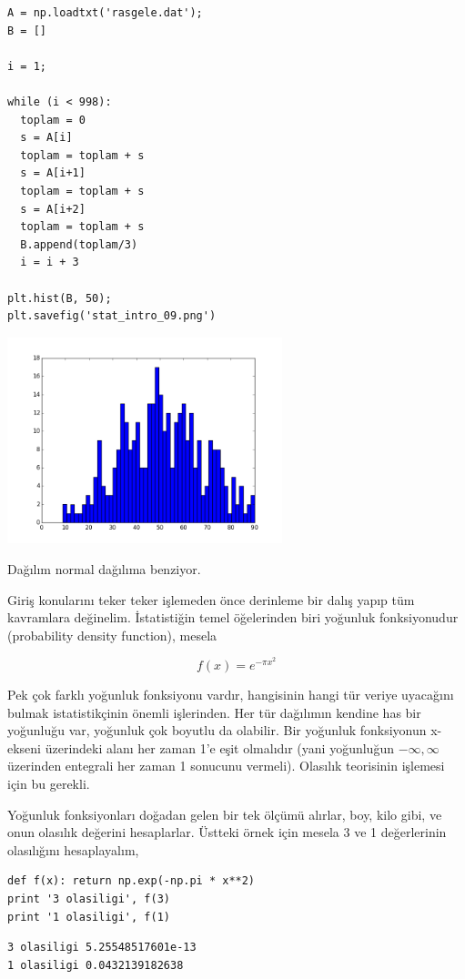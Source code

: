 \documentclass[12pt,fleqn]{article}\usepackage{../../common}
\begin{document}
\begin{verbatim}
A = np.loadtxt('rasgele.dat');
B = []

i = 1;

while (i < 998):
  toplam = 0
  s = A[i]
  toplam = toplam + s
  s = A[i+1]
  toplam = toplam + s
  s = A[i+2]
  toplam = toplam + s
  B.append(toplam/3)
  i = i + 3

plt.hist(B, 50);
plt.savefig('stat_intro_09.png')
\end{verbatim}

\includegraphics[height=6cm]{stat_intro_09.png}

Dağılım normal dağılıma benziyor.

Giriş konularını teker teker işlemeden önce derinleme bir dalış yapıp tüm
kavramlara değinelim. İstatistiğin temel öğelerinden biri yoğunluk fonksiyonudur
(probability density function), mesela

$$ f(x) = e^{-\pi x^2} $$

Pek çok farklı yoğunluk fonksiyonu vardır, hangisinin hangi tür veriye uyacağını
bulmak istatistikçinin önemli işlerinden. Her tür dağılımın kendine has bir
yoğunluğu var, yoğunluk çok boyutlu da olabilir. Bir yoğunluk fonksiyonun
x-ekseni üzerindeki alanı her zaman 1'e eşit olmalıdır (yani yoğunluğun
$-\infty,\infty$ üzerinden entegrali her zaman 1 sonucunu vermeli). Olasılık
teorisinin işlemesi için bu gerekli.

Yoğunluk fonksiyonları doğadan gelen bir tek ölçümü alırlar, boy, kilo gibi, ve
onun olasılık değerini hesaplarlar. Üstteki örnek için mesela 3 ve 1
değerlerinin olasılığını hesaplayalım,

\begin{verbatim}
def f(x): return np.exp(-np.pi * x**2)
print '3 olasiligi', f(3)
print '1 olasiligi', f(1)
\end{verbatim}

\begin{verbatim}
3 olasiligi 5.25548517601e-13
1 olasiligi 0.0432139182638
\end{verbatim}
\end{document}

